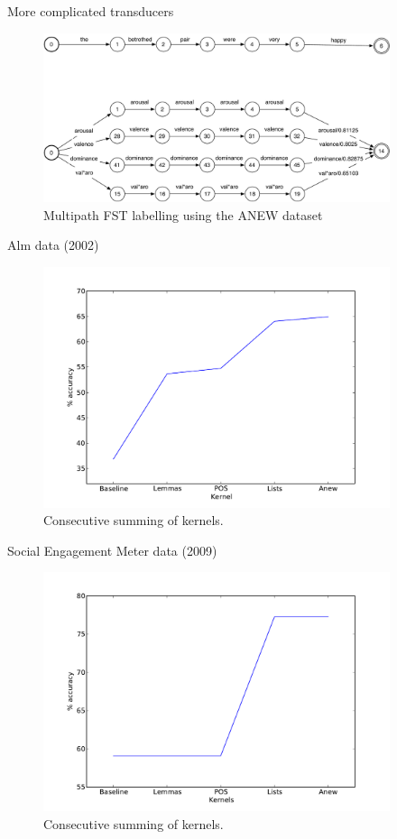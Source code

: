 \documentclass{beamer}
\begin{document}
\begin{frame}{More complicated transducers}
	\begin{figure}[htbp]
		\centering
			\includegraphics[width=4in]{figures/words-anew.pdf}
		\caption{Multipath FST labelling using the ANEW dataset}
		\label{fig:figures_words-anew}
	\end{figure}
	
\end{frame}
\begin{frame}{Alm data (2002)}
	\begin{figure}[htbp]
		\centering
			\includegraphics[width=4in]{figures/alm-kernels.pdf}
		\caption{Consecutive summing of kernels.}
		\label{fig:figures_words-anew}
	\end{figure}
\end{frame}

\begin{frame}{Social Engagement Meter data (2009)}
	\begin{figure}[htbp]
		\centering
			\includegraphics[width=4in]{figures/subject-kernels.pdf}
		\caption{Consecutive summing of kernels.}
		\label{fig:figures_words-anew}
	\end{figure}
\end{frame}
\end{document}
